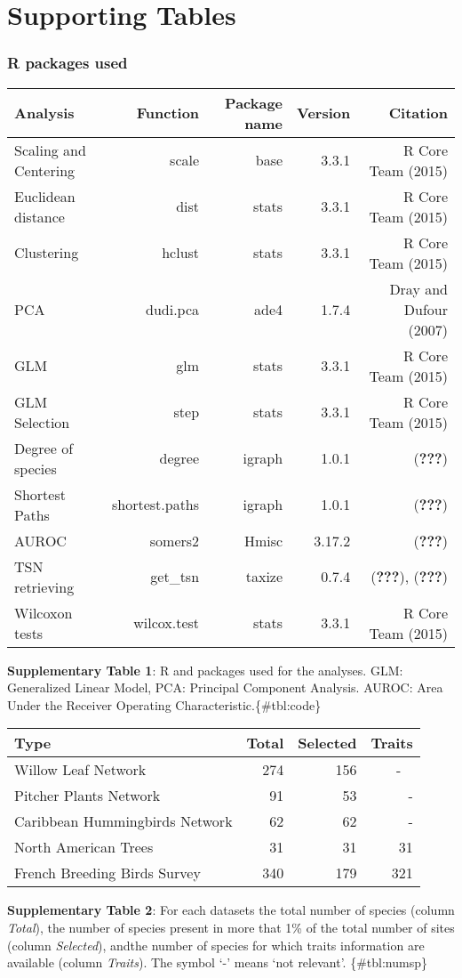 \section{Supporting Tables}\label{supporting-tables}

\subsubsection{R packages used}\label{r-packages-used}

\begin{longtable}[]{@{}lrrrr@{}}
\toprule
Analysis & Function & Package name & Version & Citation\tabularnewline
\midrule
\endhead
Scaling and Centering & scale & base & 3.3.1 & R Core Team
(2015)\tabularnewline
Euclidean distance & dist & stats & 3.3.1 & R Core Team
(2015)\tabularnewline
Clustering & hclust & stats & 3.3.1 & R Core Team (2015)\tabularnewline
PCA & dudi.pca & ade4 & 1.7.4 & Dray and Dufour (2007)\tabularnewline
GLM & glm & stats & 3.3.1 & R Core Team (2015)\tabularnewline
GLM Selection & step & stats & 3.3.1 & R Core Team (2015)\tabularnewline
Degree of species & degree & igraph & 1.0.1 &
({\textbf{???}})\tabularnewline
Shortest Paths & shortest.paths & igraph & 1.0.1 &
({\textbf{???}})\tabularnewline
AUROC & somers2 & Hmisc & 3.17.2 & ({\textbf{???}})\tabularnewline
TSN retrieving & get\_tsn & taxize & 0.7.4 & ({\textbf{???}}),
({\textbf{???}})\tabularnewline
Wilcoxon tests & wilcox.test & stats & 3.3.1 & R Core Team
(2015)\tabularnewline
\bottomrule
\end{longtable}

\textbf{Supplementary Table 1}: R and packages used for the analyses.
GLM: Generalized Linear Model, PCA: Principal Component Analysis. AUROC:
Area Under the Receiver Operating Characteristic.\{\#tbl:code\}

\begin{longtable}[]{@{}lrrr@{}}
\toprule
Type & Total & Selected & Traits\tabularnewline
\midrule
\endhead
Willow Leaf Network & 274 & 156 & - ~\tabularnewline
Pitcher Plants Network & 91 & 53 & -\tabularnewline
Caribbean Hummingbirds Network & 62 & 62 & -\tabularnewline
North American Trees & 31 & 31 & 31\tabularnewline
French Breeding Birds Survey & 340 & 179 & 321\tabularnewline
\bottomrule
\end{longtable}

\textbf{Supplementary Table 2}: For each datasets the total number of
species (column \emph{Total}), the number of species present in more
that 1\% of the total number of sites (column \emph{Selected}), andthe
number of species for which traits information are available (column
\emph{Traits}). The symbol `-' means `not relevant'. \{\#tbl:numsp\}


